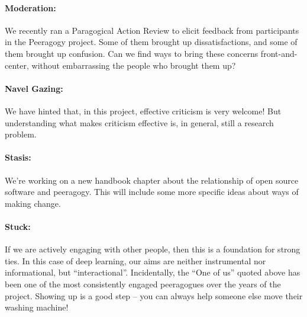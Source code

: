 \paragraph{Moderation:} We recently ran a Paragogical Action Review to elicit feedback from
participants in the Peeragogy project. Some of them brought up
dissatisfactions, and some of them brought up confusion. Can we find
ways to bring these concerns front-and-center, without embarrassing the
people who brought them up?

\paragraph{Navel Gazing:} We have hinted that, in this project, effective criticism is very
welcome! But understanding what makes criticism effective is, in
general, still a research problem.

\paragraph{Stasis:} We’re working on a new handbook chapter about the relationship of open
source software and peeragogy. This will include some more specific
ideas about ways of making change.

\paragraph{Stuck:} If we are actively engaging with other people, then this is a foundation
for strong ties. In this case of deep learning, our aims are neither
instrumental nor informational, but “interactional”. Incidentally, the
“One of us” quoted above has been one of the most consistently engaged
peeragogues over the years of the project. Showing up is a good step –
you can always help someone else move their washing machine!